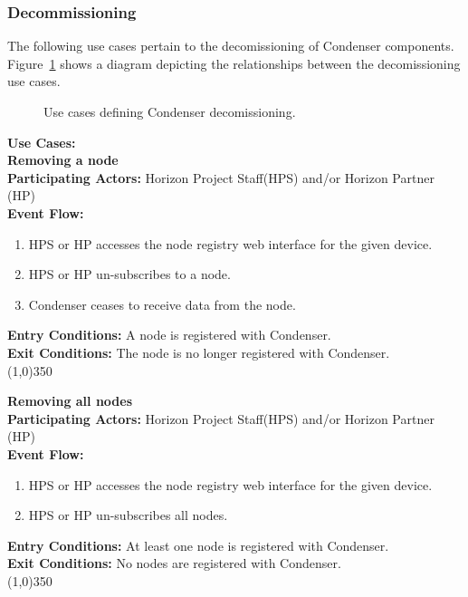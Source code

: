 \subsubsection{Decommissioning}		 
The following use cases pertain to the decomissioning of Condenser components. Figure~\ref{DecomissioningUse} shows a diagram depicting the relationships between the decomissioning use cases.
\begin{center}
	\begin{figure}[htbp]
		\caption{Use cases defining Condenser decomissioning.\label{DecomissioningUse}}
	\end{figure}
\end{center}	
\textbf{Use Cases:}\\

	\textbf{Removing a node} \\	 
	\textbf{Participating Actors:} Horizon Project Staff(HPS) and/or Horizon Partner (HP) \\
	\textbf{Event Flow:}
	\begin{enumerate}
\item HPS or HP accesses the node registry web interface for the given device. 
\item HPS or HP un-subscribes to a node.
\item Condenser ceases to receive data from the node.
	    \end{enumerate}
		\textbf{Entry Conditions:} A node is registered with Condenser.\\
		\textbf{Exit Conditions:} The node is no longer registered with Condenser.\\
		\line(1,0){350}

	\textbf{Removing all nodes} \\	 
	\textbf{Participating Actors:}  Horizon Project Staff(HPS) and/or Horizon Partner (HP) \\
	\textbf{Event Flow:}
	\begin{enumerate}
\item HPS or HP accesses the node registry web interface for the given device. 
\item HPS or HP un-subscribes all nodes.
    \end{enumerate}
	\textbf{Entry Conditions:} At least one node is registered with Condenser.\\
	\textbf{Exit Conditions:} No nodes are registered with Condenser.\\
	\line(1,0){350}		

